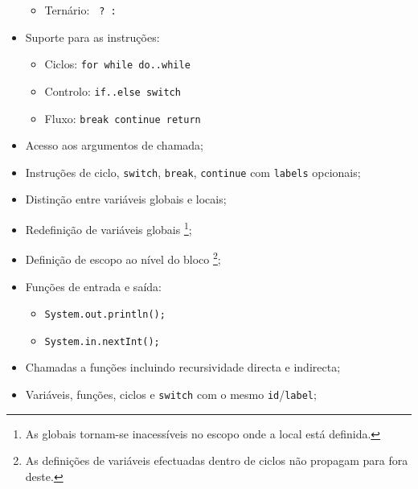 \documentclass[a4paper]{article}
\begin{document}
\begin{itemize}
\begin{itemize}
\begin{itemize}
		\end{itemize}
		\item Ternário: \quad \texttt{ ? : } 
	\end{itemize}
	\item Suporte para as instruções:
	\begin{itemize}
		\item Ciclos: \quad \texttt{for while do..while}
		\item Controlo: \quad \texttt{if..else switch}
		\item Fluxo: \quad \texttt{break continue return}
	\end{itemize}
	\item Acesso aos argumentos de chamada;
	\item Instruções de ciclo, \texttt{switch}, \texttt{break}, \texttt{continue} com \texttt{labels} opcionais;
	\item Distinção entre variáveis globais e locais;
	\item Redefinição de variáveis globais \footnote[2]{As globais tornam-se inacessíveis no escopo onde a local está definida.}; 
	\item Definição de escopo ao nível do bloco \footnote[3]{As definições de variáveis efectuadas dentro de ciclos não propagam para fora deste.}; 
	\item Funções de entrada e saída:
	\begin{itemize}
		\item \texttt{System.out.println();}
		\item \texttt{System.in.nextInt();}
	\end{itemize}
	\item Chamadas a funções incluindo recursividade directa e indirecta;
	\item Variáveis, funções, ciclos e \texttt{switch} com o mesmo \texttt{id}/\texttt{label};
\end{itemize}
\end{document}
